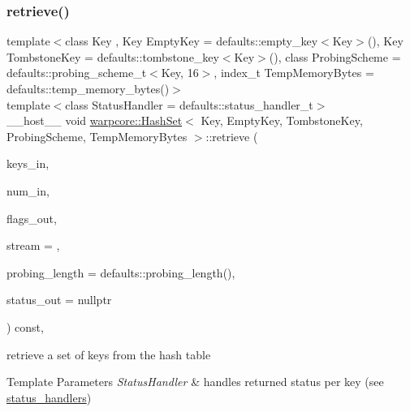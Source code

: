 \subsubsection{\texorpdfstring{retrieve()}{retrieve()}\hspace{0.1cm}{\footnotesize\ttfamily [2/2]}}
{\footnotesize\ttfamily template$<$class Key , Key Empty\+Key = defaults\+::empty\+\_\+key$<$\+Key$>$(), Key Tombstone\+Key = defaults\+::tombstone\+\_\+key$<$\+Key$>$(), class Probing\+Scheme  = defaults\+::probing\+\_\+scheme\+\_\+t$<$\+Key, 16$>$, index\+\_\+t Temp\+Memory\+Bytes = defaults\+::temp\+\_\+memory\+\_\+bytes()$>$ \\
template$<$class Status\+Handler  = defaults\+::status\+\_\+handler\+\_\+t$>$ \\
\+\_\+\+\_\+host\+\_\+\+\_\+ void \hyperlink{classwarpcore_1_1HashSet}{warpcore\+::\+Hash\+Set}$<$ Key, Empty\+Key, Tombstone\+Key, Probing\+Scheme, Temp\+Memory\+Bytes $>$\+::retrieve (\begin{DoxyParamCaption}\item[{key\+\_\+type $\ast$}]{keys\+\_\+in,  }\item[{index\+\_\+type}]{num\+\_\+in,  }\item[{bool $\ast$}]{flags\+\_\+out,  }\item[{cuda\+Stream\+\_\+t}]{stream = {},  }\item[{index\+\_\+type}]{probing\+\_\+length = {\ttfamily defaults\+:\+:probing\+\_\+length()},  }\item[{typename Status\+Handler\+::base\+\_\+type $\ast$}]{status\+\_\+out = {\ttfamily nullptr} }\end{DoxyParamCaption}) const\hspace{0.3cm}{\ttfamily [inline]}, {\ttfamily [noexcept]}}



retrieve a set of keys from the hash table 


\begin{DoxyTemplParams}{Template Parameters}
{\em Status\+Handler} & handles returned status per key (see {\ttfamily \hyperlink{namespacewarpcore_1_1status__handlers}{status\+\_\+handlers}}) \\
\hline
\end{DoxyTemplParams}

